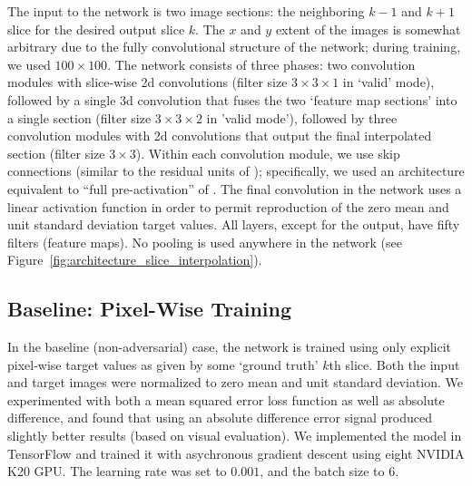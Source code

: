 \documentclass{article} %
\begin{document}
The input to the network is two image sections: the neighboring $k-1$ and $k+1$ slice for the desired output slice $k$. The $x$ and $y$ extent of the images is somewhat arbitrary due to the fully convolutional structure of the network; during training, we used $100 \times 100$. The network consists of three phases: two convolution modules with slice-wise 2d convolutions (filter size $3 \times 3 \times 1$ in `valid' mode), followed by a single 3d convolution that fuses the two `feature map sections' into a single section (filter size $3 \times 3 \times 2$ in 'valid mode'), followed by three convolution modules with 2d convolutions that output the final interpolated section (filter size $3 \times 3$). Within each convolution module, we use skip connections (similar to the residual units of \cite{he2015deep}); specifically, we used an architecture equivalent to ``full pre-activation'' of \citet{he2016identity}. The final convolution in the network uses a linear activation function in order to permit reproduction of the zero mean and unit standard deviation target values. All layers, except for the output, have fifty filters (feature maps). No pooling is used anywhere in the network (see Figure~\ref{fig:architecture_slice_interpolation}). 

\subsection{Baseline: Pixel-Wise Training}

In the baseline (non-adversarial) case, the network is trained using only explicit pixel-wise target values as given by some `ground truth' $k$th slice. Both the input and target images were normalized to zero mean and unit standard deviation. We experimented with both a mean squared error loss function as well as absolute difference, and found that using an absolute difference error signal produced slightly better results (based on visual evaluation). We implemented the model in TensorFlow \cite{abadi2016tensorflow} and trained it with asychronous gradient descent using eight NVIDIA K20 GPU. The learning rate was set to $0.001$, and the batch size to 6. 
\end{document}
